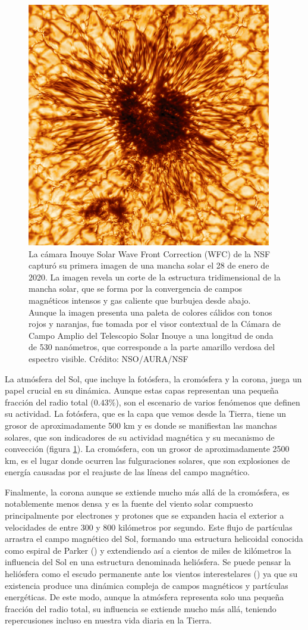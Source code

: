 \begin{figure}
    \centering
    \includegraphics[width=0.6\linewidth]{Figs/sunspot_small.png}
    \caption{La cámara Inouye Solar Wave Front Correction (WFC) de la NSF capturó su primera imagen de una mancha solar el 28 de enero de 2020. La imagen revela un corte de la estructura tridimensional de la mancha solar, que se forma por la convergencia de campos magnéticos intensos y gas caliente que burbujea desde abajo. Aunque la imagen presenta una paleta de colores cálidos con tonos rojos y naranjas, fue tomada por el visor contextual de la Cámara de Campo Amplio del Telescopio Solar Inouye a una longitud de onda de 530 nanómetros, que corresponde a la parte amarillo verdosa del espectro visible. Crédito: NSO/AURA/NSF}
    \label{fig:sunspotNSO}
\end{figure}
La atmósfera del Sol, que incluye la fotósfera, la cromósfera y la corona, juega un papel crucial en su dinámica. Aunque estas capas representan una pequeña fracción del radio total ($0.43\%$), son el escenario de varios fenómenos que definen su actividad. La fotósfera, que es la capa que vemos desde la Tierra, tiene un grosor de aproximadamente 500 km y es donde se manifiestan las manchas solares, que son indicadores de su actividad magnética y su mecanismo de convección (figura \ref{fig:sunspotNSO}). La cromósfera, con un grosor de aproximadamente 2500 km, es el lugar donde ocurren las fulguraciones solares, que son explosiones de energía causadas por el reajuste de las líneas del campo magnético. 

Finalmente, la corona aunque se extiende mucho más allá de la cromósfera, es notablemente menos densa y es la fuente del viento solar compuesto principalmente por electrones y protones que se expanden hacia el exterior a velocidades de entre 300 y 800 kilómetros por segundo. Este flujo de partículas arrastra el campo magnético del Sol, formando una estructura helicoidal conocida como espiral de Parker (\cite{Rozelot_2006}) y extendiendo así a cientos de miles de kilómetros la influencia del Sol en una estructura denominada heliósfera. Se puede pensar la heliósfera como el escudo permanente ante los vientos interestelares (\cite{schrijver_2009}) ya que su existencia produce una dinámica compleja de campos magnéticos y partículas energéticas. De este modo, aunque la atmósfera representa solo una pequeña fracción del radio total, su influencia se extiende mucho más allá, teniendo repercusiones incluso en nuestra vida diaria en la Tierra.

